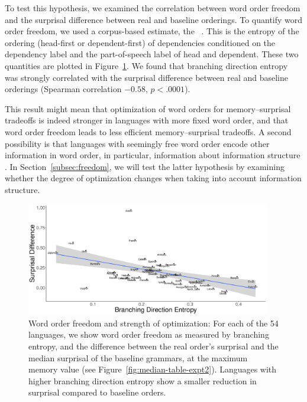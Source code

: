 To test this hypothesis, we examined the correlation between word order freedom and the surprisal difference between real and baseline orderings.
To quantify word order freedom, we used a corpus-based estimate, the ~\citep{futrell-quantifying-2015}.
This is the entropy of the ordering (head-first or dependent-first) of dependencies conditioned on the dependency label and the part-of-speech label of head and dependent.
These two quantities are plotted in Figure~\ref{fig:freedom-surp}.
We found that branching direction entropy was strongly correlated with the surprisal difference between real and baseline orderings (Spearman correlation $-0.58$, $p < .0001$).

This result might mean that optimization of word orders for memory--surprisal tradeoffs is indeed stronger in languages with more fixed word order, and that word order freedom leads to less efficient memory--surprisal tradeoffs.
A second possibility is that languages with seemingly free word order encode other information in word order, in particular, information about information structure \citep[e.g.][]{givon1988pragmatics,firbas1966defining,firbas1974aspects,myhill1985pragmatic}.
In Section~\ref{subsec:freedom}, we will test the latter hypothesis by examining whether the degree of optimization changes when taking into account information structure.




\begin{figure}
\includegraphics[width=0.95\textwidth]{figures/surprisal-branching-entropy-REAL-invert.pdf}
	\caption{Word order freedom and strength of optimization: For each of the 54 languages, we show word order freedom as measured by branching entropy, and the difference between the real order's surprisal and the median surprisal of the baseline grammars, at the maximum memory value (see Figure~\ref{fig:median-table-expt2}).
	Languages with higher branching direction entropy show a smaller reduction in surprisal compared to baseline orders.%
	}\label{fig:freedom-surp}
\end{figure}


